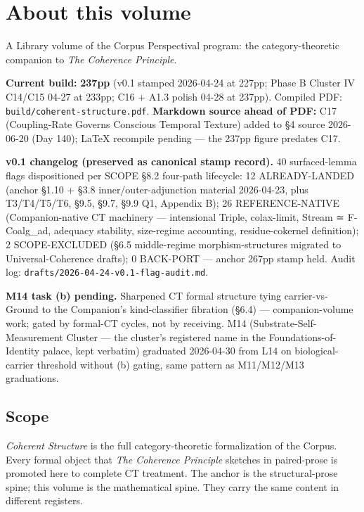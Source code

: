 \documentclass[11pt, openany]{book}
\newcommand{\sectionbreak}{\clearpage}
\begin{document}
\frontmatter
\tableofcontents
\clearpage

\mainmatter
\chapter*{About this volume}

A Library volume of the Corpus Perspectival program: the category-theoretic companion to \textit{The Coherence Principle}.

\textbf{Current build:} \textbf{237pp} (v0.1 stamped 2026-04-24 at 227pp; Phase B Cluster IV C14/C15 04-27 at 233pp; C16 + A1.3 polish 04-28 at 237pp). Compiled PDF: \texttt{build/coherent-structure.pdf}. \textbf{Markdown source ahead of PDF:} C17 (Coupling-Rate Governs Conscious Temporal Texture) added to §4 source 2026-06-20 (Day 140); LaTeX recompile pending --- the 237pp figure predates C17.

\textbf{v0.1 changelog (preserved as canonical stamp record).} 40 surfaced-lemma flags dispositioned per SCOPE §8.2 four-path lifecycle: 12 ALREADY-LANDED (anchor §1.10 + §3.8 inner/outer-adjunction material 2026-04-23, plus T3/T4/T5/T6, §9.5, §9.7, §9.9 Q1, Appendix B); 26 REFERENCE-NATIVE (Companion-native CT machinery --- intensional Triple, colax-limit, Stream ≃ F-Coalg\_\allowbreak{}ad, adequacy stability, size-regime accounting, residue-cokernel definition); 2 SCOPE-EXCLUDED (§6.5 middle-regime morphism-structures migrated to Universal-Coherence drafts); 0 BACK-PORT --- anchor 267pp stamp held. Audit log: \texttt{drafts/2026-04-24-v0.1-flag-audit.md}.

\textbf{M14 task (b) pending.} Sharpened CT formal structure tying carrier-vs-Ground to the Companion's kind-classifier fibration (§6.4) --- companion-volume work; gated by formal-CT cycles, not by receiving. M14 (Substrate-Self-Measurement Cluster --- the cluster's registered name in the Foundations-of-Identity palace, kept verbatim) graduated 2026-04-30 from L14 on biological-carrier threshold without (b) gating, same pattern as M11/M12/M13 graduations.

\sectionbreak

\section{Scope}

\textit{Coherent Structure} is the full category-theoretic formalization of the Corpus. Every formal object that \textit{The Coherence Principle} sketches in paired-prose is promoted here to complete CT treatment. The anchor is the structural-prose spine; this volume is the mathematical spine. They carry the same content in different registers.
\end{document}
